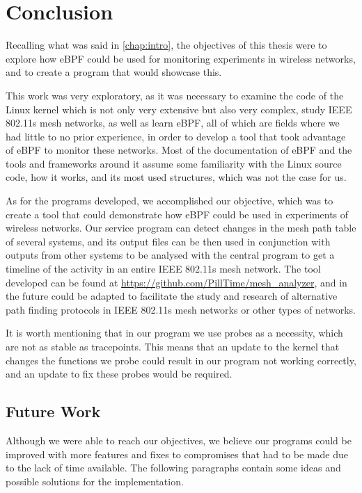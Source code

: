 \chapter{Conclusion}\label{chap:conc}

Recalling what was said in \autoref{chap:intro}, the objectives of this thesis
were to explore how eBPF could be used for monitoring experiments in wireless
networks, and to create a program that would showcase this.

This work was very exploratory, as it was necessary to examine the code of the
Linux kernel which is not only very extensive but also very complex, study
\ac{IEEE} 802.11s mesh networks, as well as learn eBPF, all of which are fields
where we had little to no prior experience, in order to develop a tool that took
advantage of eBPF to monitor these networks. Most of the documentation of eBPF
and the tools and frameworks around it assume some familiarity with the Linux
source code, how it works, and its most used structures, which was not the case
for us.

As for the programs developed, we accomplished our objective, which was to
create a tool that could demonstrate how eBPF could be used in experiments of
wireless networks. Our service program can detect changes in the mesh path table
of several systems, and its output files can be then used in conjunction with
outputs from other systems to be analysed with the central program to get a
timeline of the activity in an entire \ac{IEEE} 802.11s mesh network. The tool
developed can be found at \url{https://github.com/PillTime/mesh_analyzer}, and
in the future could be adapted to facilitate the study and research of
alternative path finding protocols in \ac{IEEE} 802.11s mesh networks or other
types of networks.

It is worth mentioning that in our program we use probes as a necessity, which
are not as stable as tracepoints. This means that an update to the kernel that
changes the functions we probe could result in our program not working
correctly, and an update to fix these probes would be required.


\section{Future Work}

Although we were able to reach our objectives, we believe our programs could be
improved with more features and fixes to compromises that had to be made due to
the lack of time available. The following paragraphs contain some ideas and
possible solutions for the implementation.

